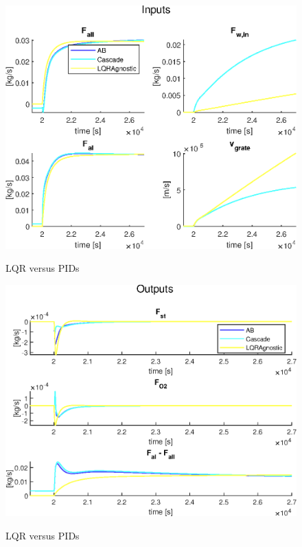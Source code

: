 \begin{figure}
    \includegraphics[width=\textwidth]{img/Fig_dump/inputs_ABCascadeLQRAgnosticStep_Q_all.eps}
    \label{fig:integral_controller_with_air_diff_cost}
    \caption{LQR versus PIDs}
\end{figure}

\begin{figure}
    \includegraphics[width=\textwidth]{img/Fig_dump/outputs_ABCascadeLQRAgnosticStep_Q_all.eps}
    \label{fig:integral_controller_with_air_diff_cost_inputs}
    \caption{LQR versus PIDs}
\end{figure}

